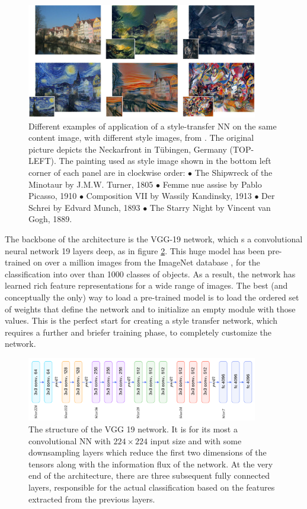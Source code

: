 \begin{figure}
    \centering
    \includegraphics[width = 0.9\textwidth]{images/st_trasf_ex}
    \caption{Different examples of application of a style-transfer NN on the same content image, with different style images, from \cite{1508.06576}. The
original picture depicts the Neckarfront in Tübingen, Germany (TOP-LEFT). The painting used as style image shown in the bottom left corner of each panel are in clockwise order: $\bullet$ The Shipwreck of the Minotaur by J.M.W. Turner, 1805 $\bullet$ Femme nue assise by Pablo Picasso, 1910 $\bullet$ Composition VII by Wassily Kandinsky, 1913 $\bullet$ Der Schrei by Edvard Munch, 1893 $\bullet$ The Starry Night by Vincent van Gogh, 1889.}
    \label{fig:ex_st_tr}
\end{figure}

The backbone of the architecture is the VGG-19 network, which s a convolutional neural network 19 layers deep, as in figure \ref{fig:vgg19}. This huge model has been pre-trained on over a million images from the ImageNet database \cite{imagenet_cvpr09}, for the classification into over than 1000 classes of objects. As a result, the network has learned rich feature representations for a wide range of images. The best (and conceptually the only) way to load a pre-trained model is to load the ordered set of weights that define the network and to initialize an empty module with those values. This is the perfect start for creating a style transfer network, which requires a further and briefer training phase, to completely customize the network.

\begin{figure}
    \centering
    \includegraphics[width = 0.9\textwidth]{images/vgg19_str}
    \caption{The structure of the VGG 19 network. It is for its most a convolutional NN with $224 \times 224$ input size and with some downsampling layers which reduce the first two dimensions of the tensors along with the information flux of the network. At the very end of the architecture, there are three subsequent fully connected layers, responsible for the actual classification based on the features extracted from the previous layers.}
    \label{fig:vgg19}
\end{figure}

